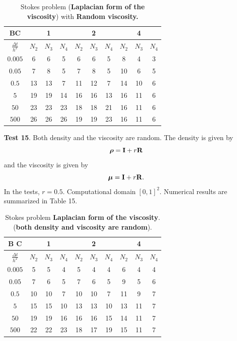 \documentclass[9pt]{article}
\newcommand{\V}[1]{\boldsymbol{#1}}
\begin{document}
\begin{table}[h]
\begin{center}
\begin{tabular}{|c|ccc|ccc|ccc|}
\hline
 BC     &     &1  &  &     & 2  &  &   &4    & \\
\hline
$\frac{\Delta t}{h^2}$    &$N_2$ &$N_3$ &$N_4$   &$N_2$ &$N_3$ &$N_4$  &$N_2$ & $N_3$ &$N_4$  \\
\hline
$0.005$    &6  &6  &5     &6  &6  &5      &8   &4  &3 \\
\hline
$0.05$     &7  &8  &5     &7  &8  &5      &10  &6  &5\\
\hline
$0.5$      &13 &13  &7    &11 &12  &7     &14  &10 &6\\
\hline
$5$        &19 &19 &14    &16 &16 &13     &16  &11 &6\\
\hline
$50$       &23 &23 &23    &18 &18 &21     &16  &11 &6\\
\hline
$500$      &26 &26 &26    &19 &19 &23     &16  &11 &6\\
\hline
\end{tabular}
\vspace{2mm} \caption{Stokes problem ({\bf Laplacian form of the viscosity}) with {\bf Random viscosity.}}
\end{center}
\end{table}


{\bf Test 15}. Both density and the viscosity are random. The density is given by
$$
\V{\rho} = {\bf I}+ r {\bf R}
$$
and the viscosity is given by
$$
\V{\mu}  = {\bf I}+ r {\bf R}.
$$
In the tests, $r=0.5$. Computational domain $[0, 1]^2$. Numerical results are summarized in Table 15.


\begin{table}[h]
\begin{center}
\begin{tabular}{|c|ccc|ccc|ccc|}
\hline
   B C     &     &1    &     &     & 2     &     &    &4     & \\
\hline
$\frac{\Delta t}{h^2}$   &$N_2$ &$N_3$ &$N_4$  &$N_2$ &$N_3$ &$N_4$  &$N_2$ & $N_3$ &$N_4$  \\
\hline
$0.005$    &5  &5    &4      &5  &4   &4      &6   &4    &4 \\
\hline
$0.05$     &7  &6    &5      &7  &6   &5      &9   &5    &6\\
\hline
$0.5$     &10  &10   &7     &10 &10   &7     &11   &9    &7\\
\hline
$5$       &15  &15  &10     &13 &13  &10     &13  &11    &7\\
\hline
$50$      &19  &19  &16     &16 &16  &15     &14  &11    &7\\
\hline
$500$     &22  &22  &23     &18 &17  &19     &15  &11    &7\\
\hline
\end{tabular}
\vspace{2mm} \caption{Stokes problem {\bf Laplacian form of the viscosity}. ({\bf both density and viscosity are random}).}
\end{center}
\end{table}
\end{document}
